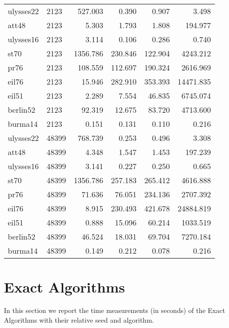 \begin{center}
\begin{longtable}{llrrrr}
ulysses22 & 2123 & 527.003 & 0.390 & 0.907 & 3.498 \\
att48 & 2123 & 5.303 & 1.793 & 1.808 & 194.977 \\
ulysses16 & 2123 & 3.114 & 0.106 & 0.286 & 0.740 \\
st70 & 2123 & 1356.786 & 230.846 & 122.904 & 4243.212 \\
pr76 & 2123 & 108.559 & 112.697 & 190.324 & 2616.969 \\
eil76 & 2123 & 15.946 & 282.910 & 353.393 & 14471.835 \\
eil51 & 2123 & 2.289 & 7.554 & 46.835 & 6745.074 \\
berlin52 & 2123 & 92.319 & 12.675 & 83.720 & 4713.600 \\
burma14 & 2123 & 0.151 & 0.131 & 0.110 & 0.216 \\

ulysses22 & 48399 & 768.739 & 0.253 & 0.496 & 3.308\\
att48 & 48399 & 4.348 & 1.547 & 1.453 & 197.239 \\
ulysses16 & 48399 & 3.141 & 0.227 & 0.250 & 0.665 \\
st70 & 48399 & 1356.786 & 257.183 & 265.412 & 4616.888 \\
pr76 & 48399 & 71.636 & 76.051 & 234.136 & 2707.392 \\
eil76 & 48399 & 8.915 & 230.493 & 421.678 & 24884.819 \\
eil51 & 48399 & 0.888 & 15.096 & 60.214 & 1033.519 \\
berlin52 & 48399 & 46.524 & 18.031 & 69.704 & 7270.184 \\
burma14 & 48399 & 0.149 & 0.212 & 0.078 & 0.216 \\

\end{longtable}
\end{center}

\newpage
\section{Exact Algorithms} 
In this section we report the time measurements (in seconds) of the Exact Algorithms with their relative seed and algorithm.

